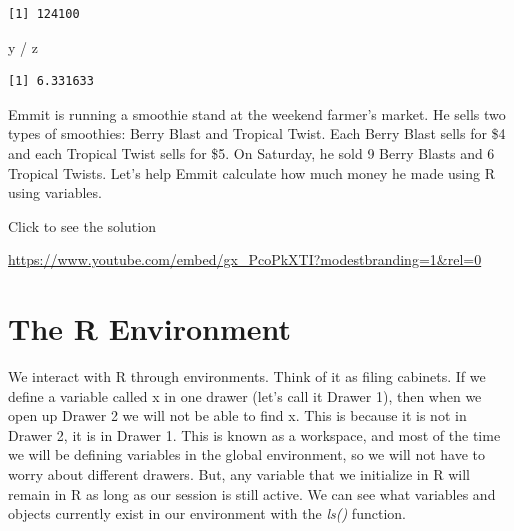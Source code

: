 \documentclass[
  letterpaper,
  DIV=11,
  numbers=noendperiod]{scrreprt}
\newenvironment{Shaded}{\begin{snugshade}}{\end{snugshade}}
\newcommand{\NormalTok}[1]{\textcolor[rgb]{0.00,0.23,0.31}{#1}}
\newcommand{\SpecialCharTok}[1]{\textcolor[rgb]{0.37,0.37,0.37}{#1}}
\begin{document}
\begin{verbatim}
[1] 124100
\end{verbatim}

\begin{Shaded}
\begin{Highlighting}[]
\NormalTok{y }\SpecialCharTok{/}\NormalTok{ z}
\end{Highlighting}
\end{Shaded}

\begin{verbatim}
[1] 6.331633
\end{verbatim}

\begin{tcolorbox}[enhanced jigsaw, colframe=quarto-callout-tip-color-frame, colback=white, breakable, rightrule=.15mm, title=\textcolor{quarto-callout-tip-color}{\faLightbulb}\hspace{0.5em}{Try it Out}, bottomtitle=1mm, toptitle=1mm, titlerule=0mm, left=2mm, coltitle=black, colbacktitle=quarto-callout-tip-color!10!white, leftrule=.75mm, opacitybacktitle=0.6, bottomrule=.15mm, opacityback=0, arc=.35mm, toprule=.15mm]

Emmit is running a smoothie stand at the weekend farmer's market. He
sells two types of smoothies: Berry Blast and Tropical Twist. Each Berry
Blast sells for \$4 and each Tropical Twist sells for \$5. On Saturday,
he sold 9 Berry Blasts and 6 Tropical Twists. Let's help Emmit calculate
how much money he made using R using variables.

Click to see the solution

\url{https://www.youtube.com/embed/gx_PcoPkXTI?modestbranding=1&rel=0}

\end{tcolorbox}

\section{The R Environment}\label{the-r-environment}

We interact with R through environments. Think of it as filing cabinets.
If we define a variable called x in one drawer (let's call it Drawer 1),
then when we open up Drawer 2 we will not be able to find x. This is
because it is not in Drawer 2, it is in Drawer 1. This is known as a
workspace, and most of the time we will be defining variables in the
global environment, so we will not have to worry about different
drawers. But, any variable that we initialize in R will remain in R as
long as our session is still active. We can see what variables and
objects currently exist in our environment with the \emph{ls()}
function.
\end{document}
